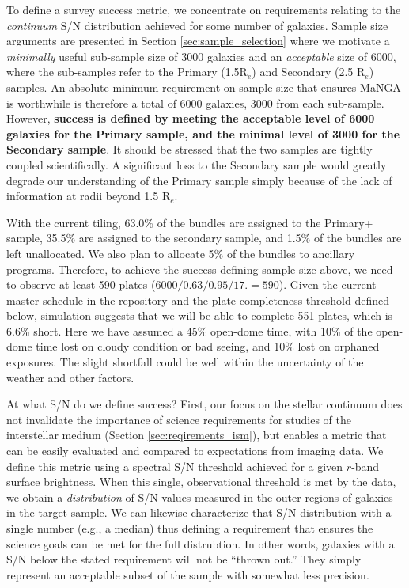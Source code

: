 \documentclass[preprint,11pt]{aastex}
\newcommand{\Reff}{{R$_{e}$}}
\begin{document}
To define a survey success metric, we concentrate on requirements relating to the {\em continuum} S/N distribution
achieved for some number of galaxies.  Sample size arguments are presented in Section \ref{sec:sample_selection} where
we motivate a {\em minimally} useful sub-sample size of 3000 galaxies and an {\em acceptable} size of 6000, where the
sub-samples refer to the Primary (1.5\Reff) and Secondary (2.5 \Reff) samples.  An absolute minimum requirement on
sample size that ensures MaNGA is worthwhile is therefore a total of 6000 galaxies, 3000 from each sub-sample.
However, {\bf success is defined by meeting the acceptable level of 6000 galaxies for the Primary sample, and the
minimal level of 3000 for the Secondary sample}.  It should be stressed that the two samples are tightly coupled
scientifically.  A significant loss to the Secondary sample would greatly degrade our understanding of the Primary
sample simply because of the lack of information at radii beyond 1.5 \Reff.

With the current tiling, 63.0\% of the bundles are assigned to the Primary+ sample, 35.5\% are assigned to the secondary sample, and 1.5\% of the bundles are left unallocated. We also plan to allocate 5\% of the bundles to ancillary programs. Therefore, to achieve the success-defining sample size above, we need to observe at least 590 plates ($6000/0.63/0.95/17.= 590$). 
Given the current master schedule in the repository and the plate completeness threshold defined below, simulation suggests that we will be able to complete 551 plates, which is 6.6\% short. Here we have assumed a 45\% open-dome time, with 10\% of the open-dome time lost on cloudy condition or bad seeing, and 10\% lost on orphaned exposures. The slight shortfall could be well within the uncertainty of the weather and other factors. 

At what S/N do we define success? First, our focus on the stellar continuum does not invalidate the importance of
science requirements for studies of the interstellar medium (Section \ref{sec:reqirements_ism}), but enables a metric
that can be easily evaluated and compared to expectations from imaging data.  We define this metric using a spectral
S/N threshold achieved for a given $r$-band surface brightness.  When this single, observational threshold is met by
the data, we obtain a {\em distribution} of S/N values measured in the outer regions of galaxies in the target sample.
We can likewise characterize that S/N distribution with a single number (e.g., a median) thus defining a requirement
that ensures the science goals can be met for the full distrubtion.  In other words, galaxies with a S/N below the
stated requirement will not be ``thrown out.''  They simply represent an acceptable subset of the sample with somewhat
less precision.
\end{document}
